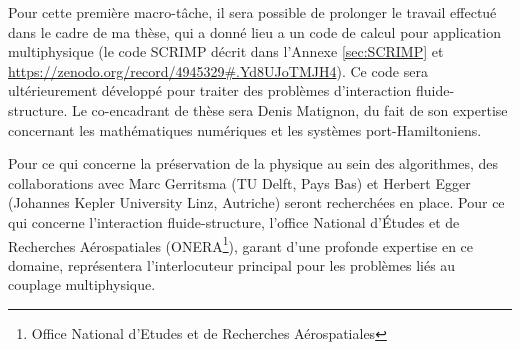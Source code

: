 \documentclass[12pt, french]{article}
\begin{document}
	Pour cette première macro-tâche, il sera possible de prolonger le travail effectué dans le cadre de ma thèse, qui a donn\'e lieu a un code de calcul pour application multiphysique (le code SCRIMP décrit dans l'Annexe \ref{sec:SCRIMP} et \url{https://zenodo.org/record/4945329#.Yd8UJoTMJH4}). Ce code sera ultérieurement développé pour traiter des problèmes d'interaction fluide-structure. Le co-encadrant de thèse sera Denis Matignon, du fait de son expertise concernant les mathématiques numériques et les systèmes port-Hamiltoniens.
	
	Pour ce qui concerne la préservation de la physique au sein des algorithmes, des collaborations avec Marc Gerritsma (TU Delft, Pays Bas) et Herbert Egger (Johannes Kepler University Linz, Autriche) seront recherchées en place. Pour ce qui concerne l'interaction fluide-structure, l'office National d'Études et de Recherches Aérospatiales (ONERA\footnote{Office National d'Etudes et de Recherches Aérospatiales}), garant d'une profonde expertise en ce domaine, représentera l'interlocuteur principal pour les problèmes liés au couplage multiphysique.
	
\end{document}
